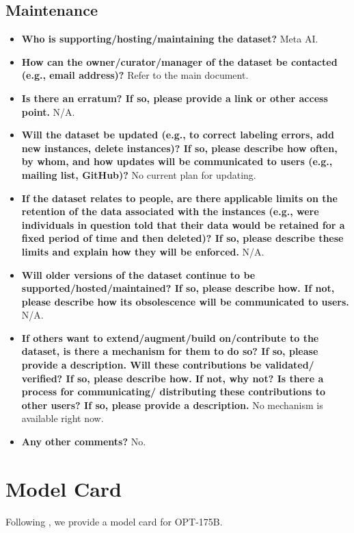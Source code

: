 \documentclass[11pt]{article}
\newcommand{\OPT}[0]{{OPT-175B}}
\begin{document}
\subsection{Maintenance}
\begin{itemize}
    \item \textbf{Who is supporting/hosting/maintaining the dataset?} Meta AI.
    \item \textbf{How can the owner/curator/manager of the dataset be contacted (e.g., email address)?} Refer to the main document.
    \item \textbf{Is there an erratum? If so, please provide a link or other access point.} N/A.
    \item \textbf{Will the dataset be updated (e.g., to correct labeling errors, add new instances, delete instances)? If so, please describe how often, by whom, and how updates will be communicated to users (e.g., mailing list, GitHub)?} No current plan for updating.
    \item \textbf{If the dataset relates to people, are there applicable limits on the retention of the data associated with the instances (e.g., were individuals in question told that their data would be retained for a fixed period of time and then deleted)? If so, please describe these limits and explain how they will be enforced.} N/A.
    \item \textbf{Will older versions of the dataset continue to be supported/hosted/maintained? If so, please describe how. If not, please describe how its obsolescence will be communicated to users.} N/A.
    \item \textbf{If others want to extend/augment/build on/contribute to the dataset, is there a mechanism for them to do so? If so, please provide a description. Will these contributions be validated/ verified? If so, please describe how. If not, why not? Is there a process for communicating/ distributing these contributions to other users? If so, please provide a description.} No mechanism is available right now.
    \item \textbf{Any other comments?} No.
\end{itemize} \section{Model Card}
\label{sec:model_card}
Following \citet{DBLP:journals/corr/abs-1810-03993}, we provide a model card for \OPT{}. 
\end{document}
